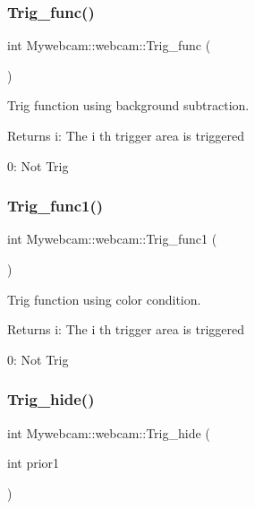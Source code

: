 \subsubsection{\texorpdfstring{Trig\+\_\+func()}{Trig\_func()}\hspace{0.1cm}{\footnotesize\ttfamily [2/2]}}
{\footnotesize\ttfamily int Mywebcam\+::webcam\+::\+Trig\+\_\+func (\begin{DoxyParamCaption}{ }\end{DoxyParamCaption})\hspace{0.3cm}{\ttfamily [inline]}}



Trig function using background subtraction. 

\begin{DoxyReturn}{Returns}
i\+: The i th trigger area is triggered 

0\+: Not Trig 
\end{DoxyReturn}
\mbox{\label{class_mywebcam_1_1webcam_a66af4250efce2c454bcd9dee3a268f47}} 
\subsubsection{\texorpdfstring{Trig\+\_\+func1()}{Trig\_func1()}}
{\footnotesize\ttfamily int Mywebcam\+::webcam\+::\+Trig\+\_\+func1 (\begin{DoxyParamCaption}{ }\end{DoxyParamCaption})\hspace{0.3cm}{\ttfamily [inline]}}



Trig function using color condition. 

\begin{DoxyReturn}{Returns}
i\+: The i th trigger area is triggered 

0\+: Not Trig 
\end{DoxyReturn}
\mbox{\label{class_mywebcam_1_1webcam_a0cde3310fc2cc39b390816a7d95a6cb5}} 
\subsubsection{\texorpdfstring{Trig\+\_\+hide()}{Trig\_hide()}}
{\footnotesize\ttfamily int Mywebcam\+::webcam\+::\+Trig\+\_\+hide (\begin{DoxyParamCaption}\item[{int}]{prior1 }\end{DoxyParamCaption})\hspace{0.3cm}{\ttfamily [inline]}}




